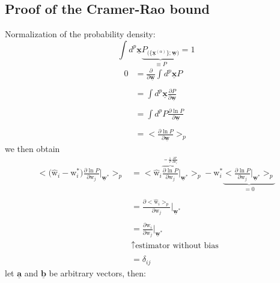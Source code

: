 \subsection{Proof of the Cramer-Rao bound}
Normalization of the probability density:
\begin{equation}
	\int d^p \underline{\mathbf{x}} \underbrace{P_{ \big( 
		 \{ \underline{\mathbf{x}}^{(\alpha)} \} 
			; \underline{\mathbf{w}} 
		\big) } }_{\equiv P}= 1
\end{equation}
\begin{equation}
	\begin{array}{ll}
	0 & = \frac{\partial}{\partial \underline{\mathbf{w}}} \int d^p 
		\underline{\mathbf{x}} P\\\\
	& = \int d^p \underline{\mathbf{x}} 
		\frac{\partial P}{\partial \underline{\mathbf{w}}}\\\\
	& = \int d^p P \frac{\partial \ln P}{\partial\underline{\mathbf{w}}}\\\\
	& = \big<\frac{\partial \ln P}{\partial \underline{\mathbf{w}}} \big>_p
	\end{array}
\end{equation}
we then obtain
\begin{equation}
	\begin{array}{ll}
	\Big<\big(\hat{\mathrm{w}}_i - \mathrm{w}_i^* \big) 
		\frac{\partial \ln P}{\partial \mathrm{w}_j} 
		\Big|_{\underline{\mathbf{w}}^*} \Big>_p 
	& = \Big< \hat{\mathrm{w}}_i \frac{ \overbrace{\partial \ln P}^{ =
		\frac{1}{P} \frac{\partial P}{\partial \mathrm{w}_j}} 
		}{\partial \mathrm{w}_j} 
		\Big|_{\underline{\mathbf{w}}^*} \Big>_p - \mathrm{w}_i^* 
			\underbrace{\Big<\frac{\partial \ln P}
				{\partial \mathrm{w}_j}
			\Big|_{\underline{\mathbf{w}}^*} \Big>_p }_{= 0}\\\\
	& = \frac{\partial <\hat{\mathrm{w}}_i>_p}{\partial \mathrm{w}_j}
		\Big|_{\underline{\mathbf{w}}^*}\\\\
	& = \frac{\partial \mathrm{w}_i}{\partial \mathrm{w}_j} 
		\Big|_{\underline{\mathbf{w}}^*}\\
	& \uparrow \text{estimator without bias}\\\\
	& = \delta_{ij}
	\end{array}
\end{equation}
let $\underline{\mathbf{a}}$ and $\underline{\mathbf{b}}$ be arbitrary vectors, then:
